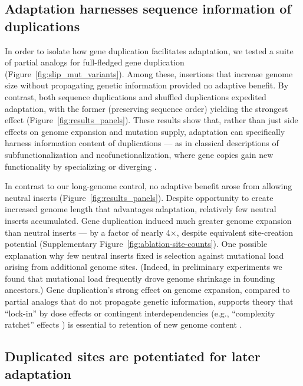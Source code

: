 \subsection{Adaptation harnesses sequence information of duplications}

In order to isolate how gene duplication facilitates adaptation, we tested a suite of partial analogs for full-fledged gene duplication (Figure~\ref{fig:slip_mut_variants}).
Among these, insertions that increase genome size without propagating genetic information provided no adaptive benefit.
By contrast, both sequence duplications and shuffled duplications expedited adaptation, with the former (preserving sequence order) yielding the strongest effect (Figure~\ref{fig:results_panels}).
These results show that, rather than just side effects on genome expansion and mutation supply, adaptation can specifically harness information content of duplications --- as in classical descriptions of subfunctionalization and neofunctionalization, where gene copies gain new functionality by specializing or diverging \citep{ohno1970evolution,Lynch2000}.

In contrast to our long-genome control, no adaptive benefit arose from allowing neutral inserts (Figure~\ref{fig:results_panels}).
Despite opportunity to create increased genome length that advantages adaptation, relatively few neutral inserts accumulated.
Gene duplication induced much greater genome expansion than neutral inserts --- by a factor of nearly 4$\times$, despite equivalent site-creation potential (Supplementary Figure~\ref{fig:ablation-site-counts}).
One possible explanation why few neutral inserts fixed is selection against mutational load arising from additional genome sites.
(Indeed, in preliminary experiments we found that mutational load frequently drove genome shrinkage in founding ancestors.)
Gene duplication's strong effect on genome expansion, compared to partial analogs that do not propagate genetic information, supports theory that ``lock-in'' by dose effects or contingent interdependencies (e.g., ``complexity ratchet'' effects \citep{Liard2020,Soyer2006,Luke2011,gould1996full}) is essential to retention of new genome content \citep{Innan2010,Wagner1998,Tautz1992,Force1999,Bergthorsson2007,Conant2008,Francino2005}.

\subsection{Duplicated sites are potentiated for later adaptation}

